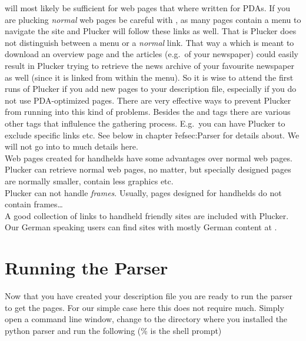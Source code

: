 \note {} will most likely be sufficient for web pages that
where written for PDAs. If you are plucking \emph{normal} web pages be
careful with , as many pages contain a menu to
navigate the site and Plucker will follow these links as well. That is
Plucker does not distinguish between a menu or a \emph{normal} link.
That way a  which is meant to download an overview page 
and the articles (e.g.\ of your newspaper) could easily result in Plucker
trying to retrieve the news archive of your favourite newspaper as well
(since it is linked from within the menu). So it is wise to attend 
the first runs of Plucker if you add new pages to your description file, 
especially if you do not use PDA-optimized pages. There are very 
effective ways to prevent Plucker from running into this kind of problems.  
Besides the  and  tags there are various 
other tags that influlence the gathering process.  E.g.\ you can have 
Plucker to exclude specific links etc. See below in chapter 
\~ref{sec:Parser} for details about. We will not go into to much details 
here.\\

\hint{} Web pages created for handhelds have some advantages over normal
web pages. Plucker can retrieve normal web pages, no matter, but specially
designed pages are normally smaller, contain less graphics etc.\\

\hint{} Plucker can not handle \emph{frames}. Usually, pages designed
for handhelds do not contain frames\ldots\\

\hint{} A good collection of links to handheld friendly sites are
included with Plucker.\\

Our German speaking users can find sites with mostly German content at
.

\section{Running the Parser}

Now that you have created your description file you are ready to run
the parser to get the pages. For our simple case here this does not
require much. Simply open a command line window, change to the
directory where you installed the python parser and run the following 
(\% is the shell prompt)\\

